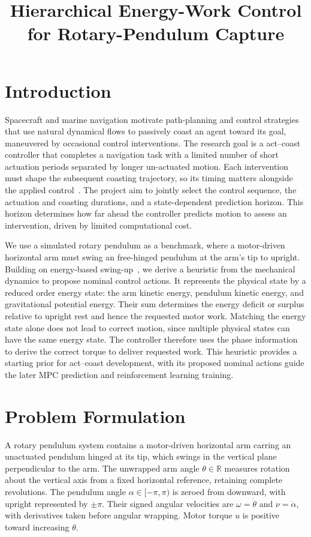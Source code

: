 \documentclass[letterpaper,10pt,conference]{ieeeconf}
\title{\bfseries Hierarchical Energy-Work Control for Rotary-Pendulum Capture}
\author{}
\begin{document}
\maketitle
\thispagestyle{empty}
\pagestyle{empty}

\section{Introduction}
Spacecraft and marine navigation motivate path-planning and control strategies that use natural dynamical flows to passively coast an agent toward its goal, maneuvered by occasional control interventions. The research goal is a act--coast controller that completes a navigation task with a limited number of short actuation periods separated by longer un-actuated motion. Each intervention must shape the subsequent coasting trajectory, so its timing matters alongside the applied control~\cite{heemels2012}. The project aim to jointly select the control sequence, the actuation and coasting durations, and a state-dependent prediction horizon. This horizon determines how far ahead the controller predicts motion to assess an intervention, driven by limited computational cost.

We use a simulated rotary pendulum as a benchmark, where a motor-driven horizontal arm must swing an free-hinged pendulum at the arm's tip to upright. Building on energy-based swing-up~\cite{astrom2000}, we derive a heuristic from the mechanical dynamics to propose nominal control actions. It represents the physical state by a reduced order energy state: the arm kinetic energy, pendulum kinetic energy, and gravitational potential energy. Their sum determines the energy deficit or surplus relative to upright rest and hence the requested motor work. Matching the energy state alone does not lead to correct motion, since multiple physical states can have the same energy state. The controller therefore uses the phase information to derive the correct torque to deliver requested work. This heuristic provides a starting prior for act--coast development, with its proposed nominal actions guide the later MPC prediction and reinforcement learning training.

\section{Problem Formulation}
A rotary pendulum system contains a motor-driven horizontal arm carring an unactuated pendulum hinged at its tip, which swings in the vertical plane perpendicular to the arm. The unwrapped arm angle $\theta\in\mathbb R$ measures rotation about the vertical axis from a fixed horizontal reference, retaining complete revolutions. The pendulum angle $\alpha\in[-\pi,\pi)$ is zeroed from downward, with upright represented by $\pm\pi$. Their signed angular velocities are $\omega=\dot\theta$ and $\nu=\dot\alpha$, with derivatives taken before angular wrapping. Motor torque $u$ is positive toward increasing $\theta$.
\end{document}
